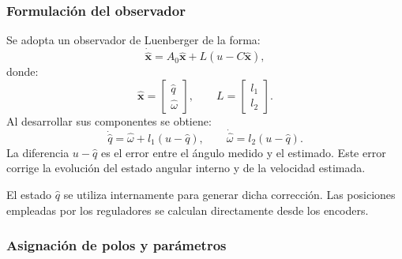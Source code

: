 \documentclass[a4paper,10pt,onecolumn,journal]{ieeeconf}
\numberwithin{equation}{section}
\begin{document}
\subsubsection{Formulación del observador}

Se adopta un observador de Luenberger de la forma:
\begin{equation}
\dot{\hat{\boldsymbol x}}=A_0\hat{\boldsymbol x}
+L\left(u-C\hat{\boldsymbol x}\right),
\end{equation}
donde:
\begin{equation}
\hat{\boldsymbol x}=\begin{bmatrix}\hat q\\\hat\omega\end{bmatrix},\qquad
L=\begin{bmatrix}l_1\\l_2\end{bmatrix}.
\end{equation}
Al desarrollar sus componentes se obtiene:
\begin{equation}
\boxed{\dot{\hat q}=\hat\omega+l_1(u-\hat q)},\qquad
\boxed{\dot{\hat\omega}=l_2(u-\hat q)}.
\label{eq:observador-continuo}
\end{equation}
La diferencia $u-\hat q$ es el error entre el ángulo medido y el estimado. Este error corrige la evolución del estado angular interno y de la velocidad estimada.

El estado $\hat q$ se utiliza internamente para generar dicha corrección. Las posiciones empleadas por los reguladores se calculan directamente desde los encoders.

\subsubsection{Asignación de polos y parámetros}
\end{document}
